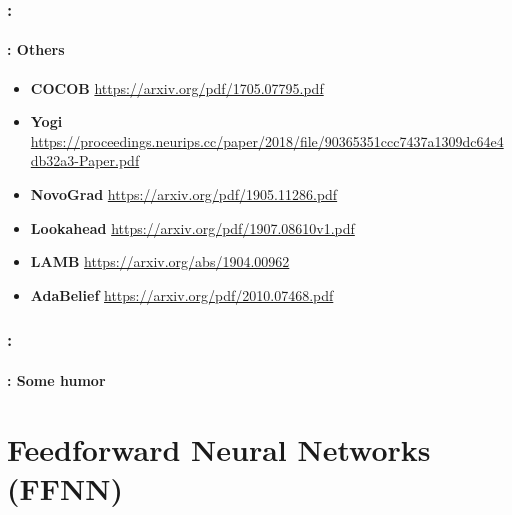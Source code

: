 \documentclass[xcolor=table]{beamer}
\begin{document}
\begin{frame}
	\frametitle{\insertshortsubtitle: \insertsection}
	\framesubtitle{\insertsubsection: Others}
	
	\begin{itemize}
		\item \textbf{COCOB} \cite{orabona2017training} {\scriptsize \url{https://arxiv.org/pdf/1705.07795.pdf}}
		
		\item \textbf{Yogi} \cite{zaheer2018adaptive} {\scriptsize \url{https://proceedings.neurips.cc/paper/2018/file/90365351ccc7437a1309dc64e4db32a3-Paper.pdf}}
		
		\item \textbf{NovoGrad} \cite{ginsburg2019training} {\scriptsize \url{https://arxiv.org/pdf/1905.11286.pdf}} 
		
		\item \textbf{Lookahead} \cite{10.5555/3454287.3455148} {\scriptsize \url{https://arxiv.org/pdf/1907.08610v1.pdf}} 
		
		\item \textbf{LAMB} \cite{you2020large} {\scriptsize \url{https://arxiv.org/abs/1904.00962}} 
		
		\item \textbf{AdaBelief} \cite{zhuang2020adabelief} {\scriptsize \url{https://arxiv.org/pdf/2010.07468.pdf}}
		
		
	\end{itemize}
	
\end{frame}

\begin{frame}
	\frametitle{\insertshortsubtitle: \insertsection}
	\framesubtitle{\insertsubsection: Some humor}
	
	\begin{center}
	\end{center}
	
\end{frame}

\section{Feedforward Neural Networks (FFNN)}

\begin{frame}
	\frametitle{\insertshortsubtitle}
	\framesubtitle{\insertsection}
	
	
\end{frame}
\end{document}
